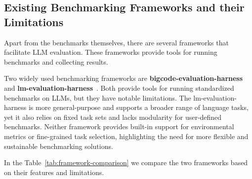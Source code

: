 \subsection{Existing Benchmarking Frameworks and their Limitations}

Apart from the benchmarks themselves, there are several frameworks that facilitate LLM evaluation.
These frameworks provide tools for running benchmarks and collecting results.

Two widely used benchmarking frameworks are \textbf{bigcode-evaluation-harness}~\cite{bigcode-evaluation-harness} and \textbf{lm-evaluation-harness}~\cite{githubGitHubEleutherAIlmevaluationharness}.
Both provide tools for running standardized benchmarks on LLMs, but they have notable limitations.
The lm-evaluation-harness is more general-purpose and supports a broader range of language tasks, yet it also relies on fixed task sets and lacks modularity for user-defined benchmarks.
Neither framework provides built-in support for environmental metrics or fine-grained task selection, highlighting the need for more flexible and sustainable benchmarking solutions.

In the Table~\ref{tab:framework-comparison} we compare the two frameworks based on their features and limitations.

